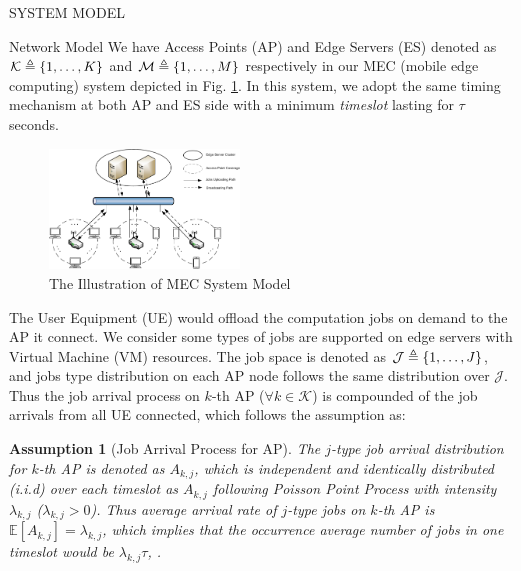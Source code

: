 \documentclass[10pt, conference, letterpaper]{IEEEtran}
\newtheorem{assumption}{Assumption}
\newcommand{\define}{\triangleq}
\DeclarePairedDelimiter{\set}{\{}{\}}
\newcommand{\apSet}{\mathcal{K}}
\newcommand{\jSpace}{\mathcal{J}}
\begin{document}
    \begin{section}{SYSTEM MODEL}
        \label{sec:model}
        \begin{subsection}{Network Model}
            We have Access Points (AP) and Edge Servers (ES) denoted as $\apSet \define \set{1,\dots,K}$ and $\mathcal{M} \define \set{1,\dots,M}$ respectively in our MEC (mobile edge computing) system depicted in Fig. \ref{fig:system}. In this system, we adopt the same timing mechanism at both AP and ES side with a minimum \emph{timeslot} lasting for $\tau$ seconds.

            \begin{figure}[ht]
                \centering
                \includegraphics[width=0.45\textwidth]{system-model.pdf}
                \caption{The Illustration of MEC System Model}
                \label{fig:system}
            \end{figure}

            The User Equipment (UE) would offload the computation jobs on demand to the AP it connect.
            We consider some types of jobs are supported on edge servers with Virtual Machine (VM) resources. The job space is denoted as $\jSpace \define \set{1,\dots, J}$, and jobs type distribution on each AP node follows the same distribution over $\jSpace$.
            Thus the job arrival process on $k$-th AP ($\forall k\in\apSet$) is compounded of the job arrivals from all UE connected, which follows the assumption as:
            \begin{assumption}[Job Arrival Process for AP]
                The $j$-type job arrival distribution for $k$-th AP is denoted as $A_{k,j}$, which is independent and identically distributed (i.i.d) over each timeslot as $A_{k,j}$ following Poisson Point Process with intensity $\lambda_{k,j}$ ($\lambda_{k,j} > 0$). Thus average arrival rate of $j$-type jobs on $k$-th AP is $\mathbb{E}[A_{k,j}]=\lambda_{k,j}$, which implies that the occurrence average number of jobs in one timeslot would be $\lambda_{k,j}\tau$, .
            \end{assumption}


\end{subsection}
\end{section}
\end{document}
